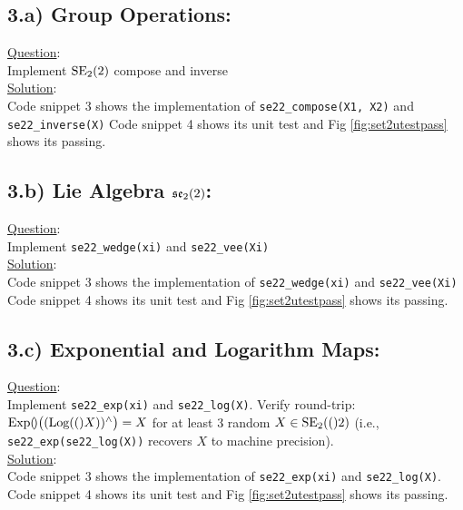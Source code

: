 \documentclass[../AAE590LGM_HW3.tex]{subfiles}
\begin{document}
\subsection{3.a) \textbf{Group Operations:}}
\underline{Question}: \\
Implement $\text{SE}_{2}(2)$ compose and inverse \\
\underline{Solution}: \\
Code snippet 3 shows the implementation of \texttt{se22\_compose(X1, X2)} and \texttt{se22\_inverse(X)}
Code snippet 4 shows its unit test and Fig \ref{fig:set2utestpass} shows its passing.

\subsection{3.b) \textbf{Lie Algebra $\mathfrak{se}_{2}(2)$:}}
\underline{Question}: \\
Implement \texttt{se22\_wedge(xi)} and \texttt{se22\_vee(Xi)} \\
\underline{Solution}: \\
Code snippet 3 shows the implementation of \texttt{se22\_wedge(xi)} and \texttt{se22\_vee(Xi)}
Code snippet 4 shows its unit test and Fig \ref{fig:set2utestpass} shows its passing.

\subsection{3.c) \textbf{Exponential and Logarithm Maps:}}
\underline{Question}: \\
Implement \texttt{se22\_exp(xi)} and \texttt{se22\_log(X)}. Verify round-trip: $\text{Exp}(\!)\bigl((\text{Log}(()X))^\wedge\bigr) = X$ for at least 3 random $X \in \text{SE}_{2}(()2)$ (i.e., \texttt{se22\_exp(se22\_log(X))} recovers $X$ to machine precision). \\
\underline{Solution}: \\
Code snippet 3 shows the implementation of \texttt{se22\_exp(xi)} and \texttt{se22\_log(X)}. \\
Code snippet 4 shows its unit test and Fig \ref{fig:set2utestpass} shows its passing.
\end{document}
